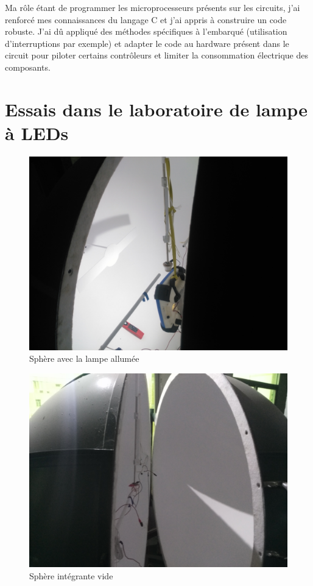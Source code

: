\documentclass[a4paper, 12pt, sffamily]{report}
\begin{document}
Ma rôle étant de programmer les microprocesseurs présents sur les circuits, j'ai renforcé mes connaissances du langage C et j'ai appris à construire un code robuste. J'ai dû appliqué des méthodes spécifiques à l'embarqué (utilisation d'interruptions par exemple) et adapter le code au hardware présent dans le circuit pour piloter certains contrôleurs et limiter la consommation électrique des composants. 



\appendix

\chapter{Essais dans le laboratoire de lampe à LEDs}
\label{cha:labo_pictures}

\begin{figure}[H]
\centering
\includegraphics[scale=0.08]{figures/photos/tests_worklamp/sphere/sphere_allumee.jpg}
\caption{Sphère avec la lampe allumée} 
\label{fig:lamp_on}
\end{figure}

\begin{figure}[H]
\centering
\includegraphics[scale=0.08]{figures/photos/tests_worklamp/sphere/spehre_vide.jpg}
\caption{Sphère intégrante vide}
\label{fig:empty_sphere}
\end{figure}
\end{document}
